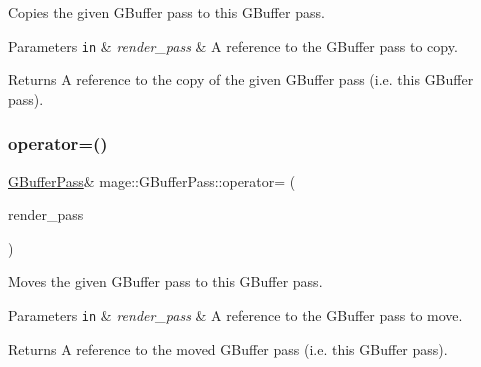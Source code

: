 Copies the given G\+Buffer pass to this G\+Buffer pass.


\begin{DoxyParams}[1]{Parameters}
\mbox{\tt in}  & {\em render\+\_\+pass} & A reference to the G\+Buffer pass to copy. \\
\hline
\end{DoxyParams}
\begin{DoxyReturn}{Returns}
A reference to the copy of the given G\+Buffer pass (i.\+e. this G\+Buffer pass). 
\end{DoxyReturn}
\hypertarget{classmage_1_1_g_buffer_pass_ace14aafdd028f12296b3fabf1e36ca02}{}\label{classmage_1_1_g_buffer_pass_ace14aafdd028f12296b3fabf1e36ca02} 
\subsubsection{\texorpdfstring{operator=()}{operator=()}\hspace{0.1cm}{\footnotesize\ttfamily [2/2]}}
{\footnotesize\ttfamily \hyperlink{classmage_1_1_g_buffer_pass}{G\+Buffer\+Pass}\& mage\+::\+G\+Buffer\+Pass\+::operator= (\begin{DoxyParamCaption}\item[{\hyperlink{classmage_1_1_g_buffer_pass}{G\+Buffer\+Pass} \&\&}]{render\+\_\+pass }\end{DoxyParamCaption})\hspace{0.3cm}{\ttfamily [delete]}}

Moves the given G\+Buffer pass to this G\+Buffer pass.


\begin{DoxyParams}[1]{Parameters}
\mbox{\tt in}  & {\em render\+\_\+pass} & A reference to the G\+Buffer pass to move. \\
\hline
\end{DoxyParams}
\begin{DoxyReturn}{Returns}
A reference to the moved G\+Buffer pass (i.\+e. this G\+Buffer pass). 
\end{DoxyReturn}
\hypertarget{classmage_1_1_g_buffer_pass_a02778a5eb3947980b204bd99daefe533}{}\label{classmage_1_1_g_buffer_pass_a02778a5eb3947980b204bd99daefe533} 
